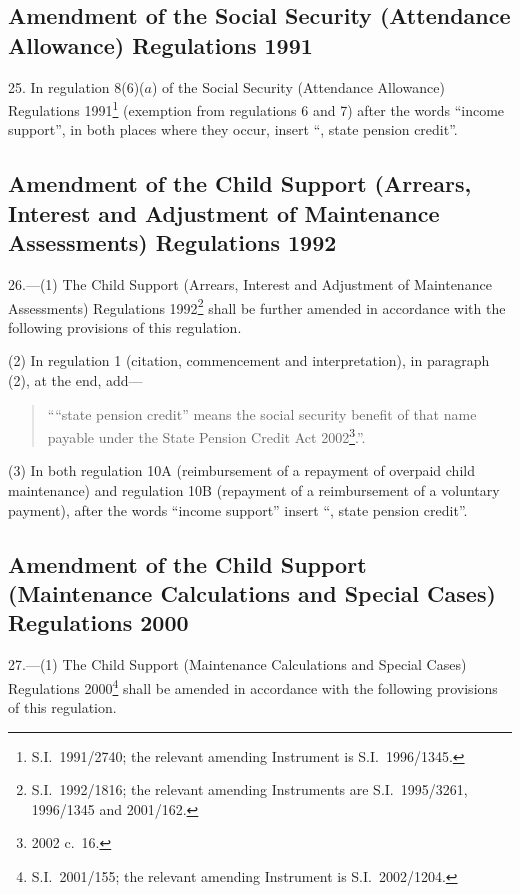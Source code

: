 \documentclass[12pt,a4paper]{article}
\begin{document}
\subsection[25. Amendment of the Social Security (Attendance Allowance) Regulations 1991]{Amendment of the Social Security (Attendance Allowance) Regulations 1991}

25.  In regulation 8(6)($a$)  of the Social Security (Attendance Allowance) Regulations 1991\footnote{S.I.\ 1991/2740; the relevant amending Instrument is S.I.\ 1996/1345.} (exemption from regulations 6 and 7) after the words “income support”, in both places where they occur, insert “, state pension credit”.

\subsection[26. Amendment of the Child Support (Arrears, Interest and Adjustment of Maintenance Assessments) Regulations 1992]{Amendment of the Child Support (Arrears, Interest and Adjustment of Maintenance Assessments) Regulations 1992}

26.---(1)  The Child Support (Arrears, Interest and Adjustment of Maintenance Assessments) Regulations 1992\footnote{S.I.\ 1992/1816; the relevant amending Instruments are S.I.\ 1995/3261, 1996/1345 and 2001/162.} shall be further amended in accordance with the following provisions of this regulation.

(2) In regulation 1 (citation, commencement and interpretation), in paragraph (2), at the end, add—
\begin{quotation}
““state pension credit” means the social security benefit of that name payable under the State Pension Credit Act 2002\footnote{2002 c.\ 16.}.”.
\end{quotation}

(3) In both regulation 10A (reimbursement of a repayment of overpaid child maintenance) and regulation 10B (repayment of a reimbursement of a voluntary payment), after the words “income support” insert “, state pension credit”.

\subsection[27. Amendment of the Child Support (Maintenance Calculations and Special Cases) Regulations 2000]{Amendment of the Child Support (Maintenance Calculations and Special Cases) Regulations 2000}

27.---(1)  The Child Support (Maintenance Calculations and Special Cases) Regulations 2000\footnote{S.I.\ 2001/155; the relevant amending Instrument is S.I.\ 2002/1204.} shall be amended in accordance with the following provisions of this regulation.
\end{document}

